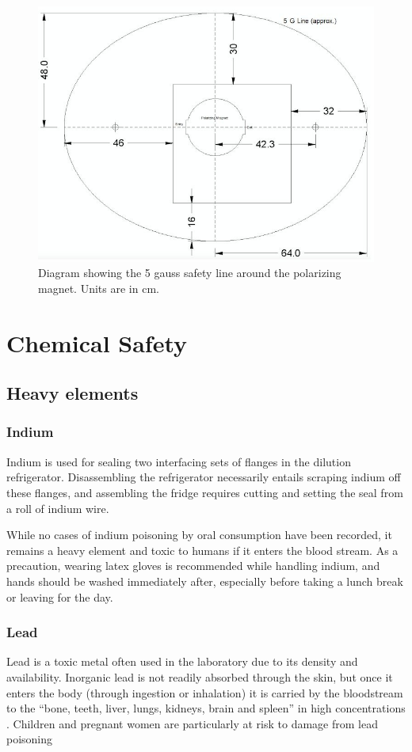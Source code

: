 \begin{figure}
 \centering
 \includegraphics[scale=0.5]{./img/polmag-5gauss-line.jpg}
 \caption{Diagram showing the 5 gauss safety line around the polarizing magnet.  Units are in cm.}
 \label{fig:polmag-5gauss-line}
\end{figure}


\section{Chemical Safety}
\subsection{Heavy elements}
\subsubsection{Indium}
Indium is used for sealing two interfacing sets of flanges in the dilution refrigerator.  Disassembling the refrigerator necessarily entails scraping indium off these flanges, and assembling the fridge requires cutting and setting the seal from a roll of indium wire.

While no cases of indium poisoning by oral consumption have been recorded, it remains a heavy element and toxic to humans if it enters the blood stream.  As a precaution, wearing latex gloves is recommended while handling indium, and hands should be washed immediately after, especially before taking a lunch break or leaving for the day.

\subsubsection{Lead}
Lead is a toxic metal often used in the laboratory due to its density and availability.  Inorganic lead is not readily absorbed through the skin, but once it enters the body (through ingestion or inhalation) it is carried by the bloodstream to the ``bone, teeth, liver, lungs, kidneys, brain and spleen'' in high concentrations \cite{aafp98}.  Children and pregnant women are particularly at risk to damage from lead poisoning \cite{epa13}


